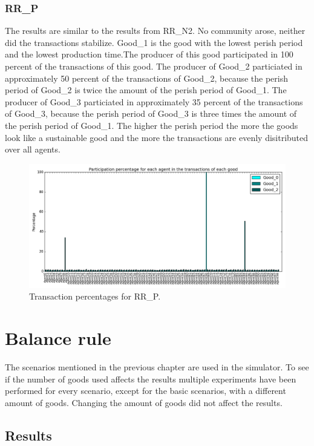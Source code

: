 \documentclass[twoside,openright]{uva-bachelor-thesis}
\begin{document}
\subsubsection{RR\_P}
The results are similar to the results from RR\_N2. No community arose, neither did the transactions stabilize. Good\_1 is the good with the lowest perish period and the lowest production time.The producer of this good participated in 100 percent of the transactions of this good. The producer of Good\_2 particiated in approximately 50  percent of the transactions of Good\_2, because the perish period of Good\_2 is twice the amount of the perish period of Good\_1. The producer of Good\_3 particiated in approximately 35 percent of the transactions of Good\_3, because the perish period  of Good\_3 is three times the amount of the perish period of Good\_1. The higher the perish period the more the goods look like a sustainable good and the more the transactions are evenly disitributed over all agents.\\
\begin{figure}[h!]
  \centering
    \includegraphics[scale=0.4]{Simulation_figures/RR_P/Figure1_20k}
  \caption{Transaction percentages for RR\_P.}
\end{figure}


\section{Balance rule}
The scenarios mentioned in the previous chapter are used in the simulator. To see if the number of goods used affects the results multiple experiments have been performed for every scenario, except for the basic scenarios, with a different amount of goods. Changing the amount of goods did not affect the results.
\subsection{Results}
\end{document}
